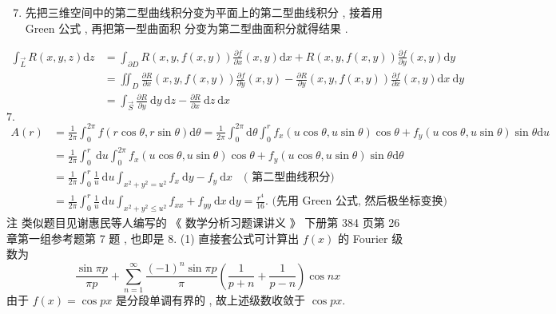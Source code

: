 \documentclass[10pt]{article}
\begin{document}
{\begin{enumerate}
  \setcounter{enumi}{6}
  \item  先把三维空间中的第二型曲线积分变为平面上的第二型曲线积分 ,  接着用  Green  公式 ,  再把第一型曲面积   分变为第二型曲面积分就得结果 .
\end{enumerate}
$$
\begin{aligned}
\int_{\vec{L}} R(x, y, z) \mathrm{d} z &=\int_{\partial D} R(x, y, f(x, y)) \frac{\partial f}{\partial x}(x, y) \mathrm{d} x+R(x, y, f(x, y)) \frac{\partial f}{\partial y}(x, y) \mathrm{d} y \\
&=\iint_{D} \frac{\partial R}{\partial x}(x, y, f(x, y)) \frac{\partial f}{\partial y}(x, y)-\frac{\partial R}{\partial y}(x, y, f(x, y)) \frac{\partial f}{\partial x}(x, y) \mathrm{d} x \mathrm{~d} y \\
&=\int_{\vec{S}} \frac{\partial R}{\partial y} \mathrm{~d} y \mathrm{~d} z-\frac{\partial R}{\partial x} \mathrm{~d} z \mathrm{~d} x
\end{aligned}
$$
$7 .$
$$
\begin{aligned}
A(r) &=\frac{1}{2 \pi} \int_{0}^{2 \pi} f(r \cos \theta, r \sin \theta) \mathrm{d} \theta=\frac{1}{2 \pi} \int_{0}^{2 \pi} \mathrm{d} \theta \int_{0}^{r} f_{x}(u \cos \theta, u \sin \theta) \cos \theta+f_{y}(u \cos \theta, u \sin \theta) \sin \theta \mathrm{d} u \\
&=\frac{1}{2 \pi} \int_{0}^{r} \mathrm{~d} u \int_{0}^{2 \pi} f_{x}(u \cos \theta, u \sin \theta) \cos \theta+f_{y}(u \cos \theta, u \sin \theta) \sin \theta \mathrm{d} \theta \\
&=\frac{1}{2 \pi} \int_{0}^{r} \frac{1}{u} \mathrm{~d} u \int_{x^{2}+y^{2}=u^{2}} f_{x} \mathrm{~d} y-f_{y} \mathrm{~d} x \quad(\text { 第二型曲线积分) }\\
&=\frac{1}{2 \pi} \int_{0}^{r} \frac{1}{u} \mathrm{~d} u \int_{x^{2}+y^{2} \leqslant u^{2}} f_{x x}+f_{y y} \mathrm{~d} x \mathrm{~d} y=\frac{r^{4}}{16} \text {. (先用 Green 公式, 然后极坐标变换) }
\end{aligned}
$$
 注   类似题目见谢惠民等人编写的 《 数学分析习题课讲义 》 下册第  384  页第  26  章第一组参考题第  7  题 ,  也即是  8. (1)  直接套公式可计算出  $f(x)$  的  Fourier  级数为 
$$
\frac{\sin \pi p}{\pi p}+\sum_{n=1}^{\infty} \frac{(-1)^{n} \sin \pi p}{\pi}\left(\frac{1}{p+n}+\frac{1}{p-n}\right) \cos n x
$$
 由于  $f(x)=\cos p x$  是分段单调有界的 ,  故上述级数收敛于  $\cos p x$.

}
\end{document}
